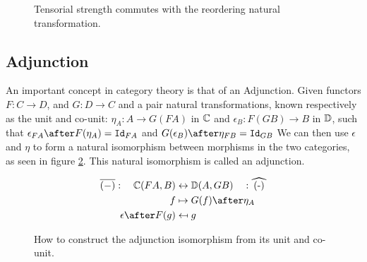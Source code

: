 \documentclass{Report}
\begin{document}
\begin{figure}
    \centering
    \begin{framed}
        \begin{minipage}{0.45\textwidth}
        \end{minipage}
    \end{framed}
    \caption{Tensorial strength commutes with the reordering natural transformation.}
    \label{TensorStrengthAlpha}
\end{figure}






\subsection{Adjunction}\label{WhatsAnAdjunction}
An important concept in category theory is that of an Adjunction. Given functors $F: C\rightarrow D$, and  $G: D\rightarrow C$ and a pair natural transformations, known respectively as the unit and co-unit: $\eta_A: A \rightarrow G(F A)$ in $\mathbb{C}$ and $\epsilon_B: F(G B) \rightarrow B$ in $\mathbb{D}$, such that $\epsilon_{F A}\after F(\eta_A) = \Id{F A}$ and $G(\epsilon_B)\after \eta_{F B} = \Id{G B}$ We can then use $\epsilon$ and $\eta$ to form a natural isomorphism between morphisms in the two categories, as seen in figure \ref{Adjunction}. This natural isomorphism is called an adjunction.


\begin{figure}
    \begin{framed}
    \begin{align*}
        \bar{(-)}: \quad\C(FA, B) &\leftrightarrow \DC(A, GB)   \quad: \widehat{(-)}\\
        f & \mapsto G(f)\after\eta_A \\
        \epsilon\after F(g) & \mapsfrom g\\
    \end{align*}
    \end{framed}
    \caption{How to construct the adjunction isomorphism from its unit and co-unit.}
    \label{Adjunction}
\end{figure}
\end{document}
